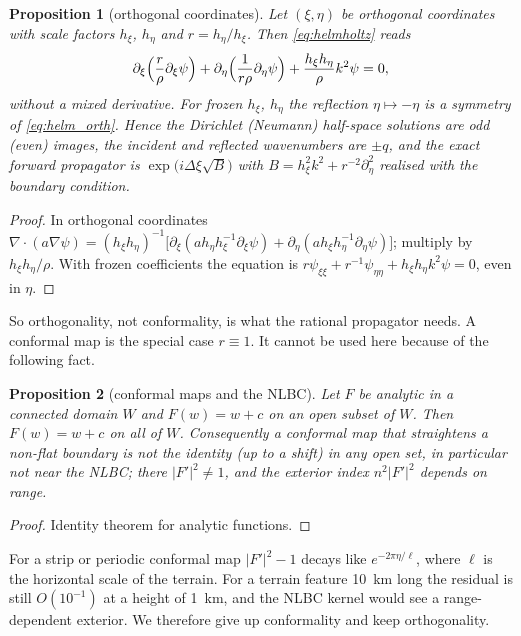 \documentclass[11pt,a4paper]{article}
\newtheorem{proposition}{Proposition}
\theoremstyle{remark}
\newcommand{\pd}{\partial}
\begin{document}
\begin{proposition}[orthogonal coordinates]\label{prop:orth}
Let $(\xi,\eta)$ be orthogonal coordinates with scale factors $h_\xi$,
$h_\eta$ and $r=h_\eta/h_\xi$. Then \eqref{eq:helmholtz} reads
\begin{equation}\label{eq:helm_orth}
\pd_\xi\Bigl(\frac{r}{\rho}\pd_\xi\psi\Bigr)+\pd_\eta\Bigl(\frac{1}{r\rho}\pd_\eta\psi\Bigr)+\frac{h_\xi h_\eta}{\rho}k^2\psi=0,
\end{equation}
without a mixed derivative. For frozen $h_\xi$, $h_\eta$ the reflection
$\eta\mapsto-\eta$ is a symmetry of \eqref{eq:helm_orth}. Hence the
Dirichlet (Neumann) half-space solutions are odd (even) images, the incident and
reflected wavenumbers are $\pm q$, and the exact forward propagator is
$\exp\bigl(i\Delta\xi\sqrt{B}\bigr)$ with $B=h_\xi^2k^2+r^{-2}\pd^2_\eta$
realised with the boundary condition.
\end{proposition}
\begin{proof}
In orthogonal coordinates
$\nabla\cdot(a\nabla\psi)=(h_\xi h_\eta)^{-1}\bigl[\pd_\xi(ah_\eta h_\xi^{-1}\pd_\xi\psi)+\pd_\eta(ah_\xi h_\eta^{-1}\pd_\eta\psi)\bigr]$;
multiply by $h_\xi h_\eta/\rho$. With frozen coefficients the equation is
$r\psi_{\xi\xi}+r^{-1}\psi_{\eta\eta}+h_\xi h_\eta k^2\psi=0$, even in $\eta$.
\end{proof}

So orthogonality, not conformality, is what the rational propagator needs. A
conformal map is the special case $r\equiv1$. It cannot be used here because of
the following fact.

\begin{proposition}[conformal maps and the NLBC]\label{prop:conformal}
Let $F$ be analytic in a connected domain $W$ and $F(w)=w+c$ on an open subset
of $W$. Then $F(w)=w+c$ on all of $W$. Consequently a conformal map that
straightens a non-flat boundary is not the identity (up to a shift) in any open
set, in particular not near the NLBC; there $|F'|^2\ne1$, and the exterior index
$n^2|F'|^2$ depends on range.
\end{proposition}
\begin{proof}
Identity theorem for analytic functions.
\end{proof}

For a strip or periodic conformal map $|F'|^2-1$ decays like
$e^{-2\pi\eta/\ell}$, where $\ell$ is the horizontal scale of the terrain. For a
terrain feature \SI{10}{km} long the residual is still $O(10^{-1})$ at a height
of \SI{1}{km}, and the NLBC kernel would see a range-dependent exterior. We
therefore give up conformality and keep orthogonality.
\end{document}
